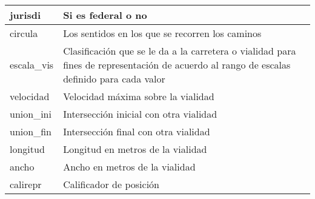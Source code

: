 \begin{longtable}{|p{8cm}|p{8cm}|}
    jurisdi & Si es federal o no\\
    \hline
    circula & Los sentidos en los que se recorren los caminos\\
    \hline
    escala\_vis & Clasificación que se le da a la carretera o vialidad para fines de representación de acuerdo al rango de escalas definido para cada valor \\
    \hline
    velocidad & Velocidad máxima sobre la vialidad\\
    \hline
    union\_ini & Intersección inicial con otra vialidad\\
    \hline
    union\_fin & Intersección final con otra vialidad\\
    \hline
    longitud & Longitud en metros de la vialidad\\
    \hline
    ancho & Ancho en metros de la vialidad\\
    \hline
    calirepr & Calificador de posición \\
    \hline
\end{longtable}
\caption{Variables dentro de los archivos shape de la Red Carretera}
\label{tab:redcarretera}
